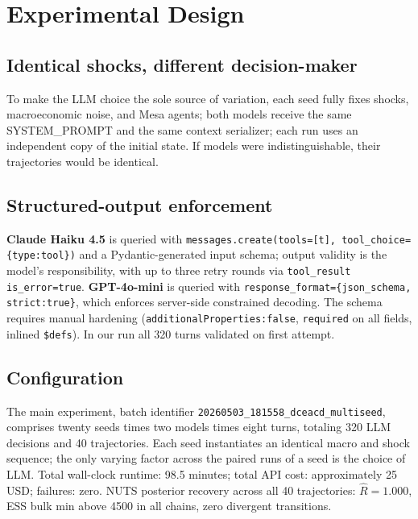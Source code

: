 \documentclass[conference]{IEEEtran}
\begin{document}
\section{Experimental Design}

\subsection{Identical shocks, different decision-maker}

To make the LLM choice the sole source of variation, each seed fully
fixes shocks, macroeconomic noise, and Mesa agents; both models
receive the same SYSTEM\_PROMPT and the same context serializer; each
run uses an independent copy of the initial state. If models were
indistinguishable, their trajectories would be identical.

\subsection{Structured-output enforcement}

\textbf{Claude Haiku 4.5} is queried with
\texttt{messages.create(tools=[t], tool\_choice=\{type:tool\})} and a
Pydantic-generated input schema; output validity is the model's
responsibility, with up to three retry rounds via
\texttt{tool\_result is\_error=true}. \textbf{GPT-4o-mini} is queried
with \texttt{response\_format=\{json\_schema, strict:true\}}, which
enforces server-side constrained decoding. The schema requires manual
hardening (\texttt{additionalProperties:false}, \texttt{required} on
all fields, inlined \texttt{\$defs}). In our run all 320 turns
validated on first attempt.

\subsection{Configuration}

The main experiment, batch identifier
\texttt{20260503\_181558\_dceacd\_multiseed}, comprises twenty seeds
times two models times eight turns, totaling 320 LLM decisions and 40
trajectories. Each seed instantiates an identical macro and shock
sequence; the only varying factor across the paired runs of a seed is
the choice of LLM. Total wall-clock runtime: 98.5 minutes; total API
cost: approximately 25 USD; failures: zero. NUTS posterior recovery
across all 40 trajectories: $\hat R = 1.000$, ESS bulk min above 4500
in all chains, zero divergent transitions.
\end{document}

